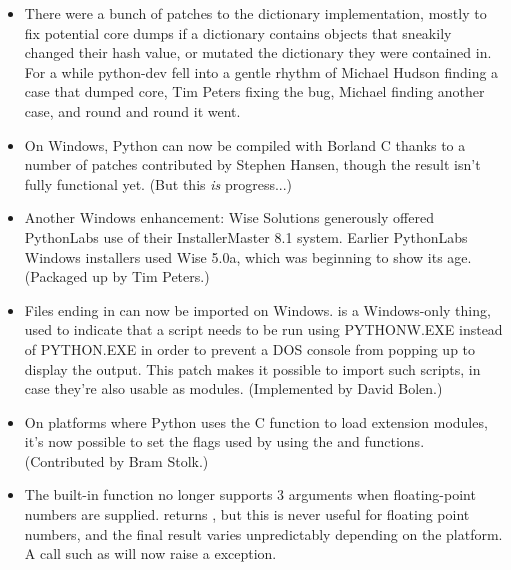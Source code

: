 \documentclass{howto}
\begin{document}
\begin{itemize}
  \item There were a bunch of patches to the dictionary
  implementation, mostly to fix potential core dumps if a dictionary
  contains objects that sneakily changed their hash value, or mutated
  the dictionary they were contained in. For a while python-dev fell
  into a gentle rhythm of Michael Hudson finding a case that dumped
  core, Tim Peters fixing the bug, Michael finding another case, and round
  and round it went.   

  \item On Windows, Python can now be compiled with Borland C thanks
  to a number of patches contributed by Stephen Hansen, though the
  result isn't fully functional yet.  (But this \emph{is} progress...)
  
  \item Another Windows enhancement: Wise Solutions generously offered
  PythonLabs use of their InstallerMaster 8.1 system.  Earlier
  PythonLabs Windows installers used Wise 5.0a, which was beginning to
  show its age.  (Packaged up by Tim Peters.)

  \item Files ending in  can now be imported on Windows.
   is a Windows-only thing, used to indicate that a script
  needs to be run using PYTHONW.EXE instead of PYTHON.EXE in order to
  prevent a DOS console from popping up to display the output.  This
  patch makes it possible to import such scripts, in case they're also
  usable as modules.  (Implemented by David Bolen.)

  \item On platforms where Python uses the C  function 
  to load extension modules, it's now possible to set the flags used 
  by  using the  and
   functions.    (Contributed by Bram Stolk.)

  \item The  built-in function no longer supports 3
  arguments when floating-point numbers are supplied.
   returns , but
  this is never useful for floating point numbers, and the final
  result varies unpredictably depending on the platform.  A call such
  as  will now raise a 
  exception.
  
\end{itemize}


\end{document}
